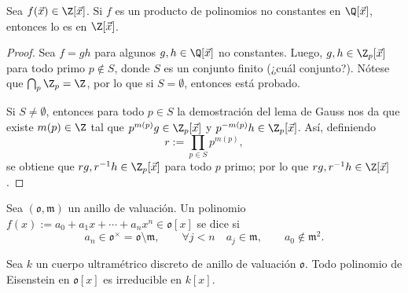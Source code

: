 \documentclass[teoria-numeros.tex]{subfiles}
\begin{document}
\begin{prop}
	Sea $f(\vec x) \in \Z[\vec x]$.
	Si $f$ es un producto de polinomios no constantes en $\Q[\vec x]$, entonces lo es en $\Z[\vec x]$.
\end{prop}
\begin{proof}
	Sea $f = gh$ para algunos $g, h \in \Q[\vec x]$ no constantes.
	Luego, $g, h \in \Z_p[\vec x]$ para todo primo $p \notin S$, donde $S$ es un conjunto finito (¿cuál conjunto?).
	Nótese que $\bigcap_{p} \Z_p = \Z$, por lo que si $S = \emptyset$, entonces está probado.

	Si $S \ne \emptyset$, entonces para todo $p \in S$ la demostración del lema de Gauss nos da que existe $m(p) \in \Z$
	tal que $p^{m(p)}g \in \Z_p[\vec x]$ y $p^{-m(p)}h \in \Z_p[\vec x]$.
	Así, definiendo
	$$ r := \prod_{p\in S} p^{m(p)}, $$
	se obtiene que $rg, r^{-1}h \in \Z_p[\vec x]$ para todo $p$ primo; por lo que $rg, r^{-1}h \in \Z[\vec x]$.
\end{proof}

\begin{mydef}
	Sea $(\mathfrak{o}, \mathfrak{m})$ un anillo de valuación.
	Un polinomio $f(x) := a_0 + a_1x + \cdots + a_nx^n \in \mathfrak{o}[x]$ se dice  si
	$$ a_n \in \mathfrak{o}^\times = \mathfrak{o \setminus m}, \qquad \forall j < n \quad a_j \in \mathfrak{m}, \qquad a_0 \notin \mathfrak{m}^2. $$
\end{mydef}

\begin{thm}
	Sea $k$ un cuerpo ultramétrico discreto de anillo de valuación $\mathfrak{o}$.
	Todo polinomio de Eisenstein en $\mathfrak{o}[x]$ es irreducible en $k[x]$.
\end{thm}
\end{document}
